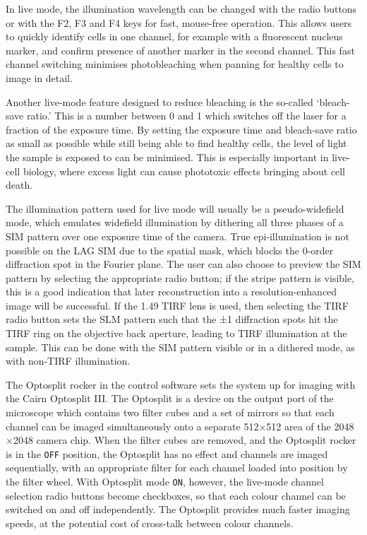 In live mode, the illumination wavelength can be changed with the radio buttons or with the F2, F3 and F4 keys for fast, mouse-free operation.
This allows users to quickly identify cells in one channel, for example with a fluorescent nucleus marker, and confirm presence of another marker in the second channel.
This fast channel switching minimises photobleaching when panning for healthy cells to image in detail.

Another live-mode feature designed to reduce bleaching is the so-called `bleach-save ratio.'
This is a number between 0 and 1 which switches off the laser for a fraction of the exposure time.
By setting the exposure time and bleach-save ratio as small as possible while still being able to find healthy cells, the level of light the sample is exposed to can be minimised.
This is especially important in live-cell biology, where excess light can cause phototoxic effects bringing about cell death.

The illumination pattern used for live mode will usually be a pseudo-widefield mode, which emulates widefield illumination by dithering all three phases of a SIM pattern over one exposure time of the camera.
True epi-illumination is not possible on the LAG SIM due to the spatial mask, which blocks the 0-order diffraction spot in the Fourier plane.
The user can also choose to preview the SIM pattern by selecting the appropriate radio button; if the stripe pattern is visible, this is a good indication that later reconstruction into a resolution-enhanced image will be successful.
If the \SI{1.49}{\numaperture} TIRF lens is used, then selecting the TIRF radio button sets the SLM pattern such that the ±1 diffraction spots hit the TIRF ring on the objective back aperture, leading to TIRF illumination at the sample.
This can be done with the SIM pattern visible or in a dithered mode, as with non-TIRF illumination.

The Optosplit rocker in the control software sets the system up for imaging with the Cairn Optosplit III.
The Optosplit is a device on the output port of the microscope which contains two filter cubes and a set of mirrors so that each channel can be imaged simultaneously onto a separate 512$\times$512 area of the 2048$\times$2048 camera chip.
When the filter cubes are removed, and the Optosplit rocker is in the \texttt{OFF} position, the Optosplit has no effect and channels are imaged sequentially, with an appropriate filter for each channel loaded into position by the filter wheel.
With Optosplit mode \texttt{ON}, however, the live-mode channel selection radio buttons become checkboxes, so that each colour channel can be switched on and off independently.
The Optosplit provides much faster imaging speeds, at the potential cost of cross-talk between colour channels.

